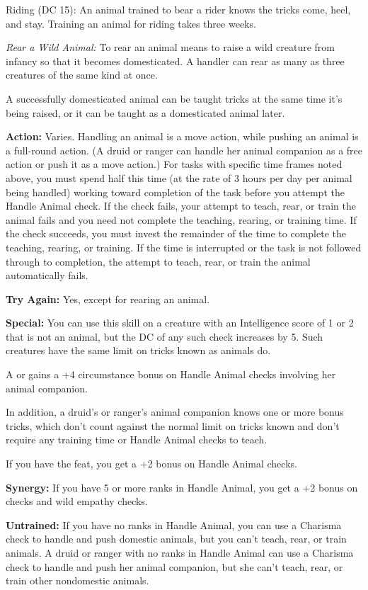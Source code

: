 Riding (DC 15): An animal trained to bear a rider knows the tricks come, heel, 
and stay. Training an animal for riding takes three weeks.

\vspace{12pt}
\textit{Rear a Wild Animal:} To rear an animal means to raise a wild creature from 
infancy so that it becomes domesticated. A handler can rear as many as three creatures 
of the same kind at once.

A successfully domesticated animal can be taught tricks at the same time it's being 
raised, or it can be taught as a domesticated animal later.

\textbf{Action:} Varies. Handling an animal is a move action, while pushing an 
animal is a full-round action. (A druid or ranger can handle her animal companion 
as a free action or push it as a move action.) For tasks with specific time frames 
noted above, you must spend half this time (at the rate of 3 hours per day per 
animal being handled) working toward completion of the task before you attempt 
the Handle Animal check. If the check fails, your attempt to teach, rear, or train 
the animal fails and you need not complete the teaching, rearing, or training time. 
If the check succeeds, you must invest the remainder of the time to complete the 
teaching, rearing, or training. If the time is interrupted or the task is not followed 
through to completion, the attempt to teach, rear, or train the animal automatically 
fails.

\textbf{Try Again:} Yes, except for rearing an animal.

\textbf{Special:} You can use this skill on a creature with an Intelligence score 
of 1 or 2 that is not an animal, but the DC of any such check increases by 5. Such 
creatures have the same limit on tricks known as animals do.

A  or  gains a +4 circumstance bonus on Handle Animal checks involving 
her animal companion.

In addition, a druid's or ranger's animal companion knows one or more bonus tricks, 
which don't count against the normal limit on tricks known and don't require any 
training time or Handle Animal checks to teach.

If you have the  feat, you get a +2 bonus on Handle Animal checks.

\textbf{Synergy:} If you have 5 or more ranks in Handle Animal, you get a +2 bonus 
on  checks and wild empathy checks.

\textbf{Untrained:} If you have no ranks in Handle Animal, you can use a Charisma 
check to handle and push domestic animals, but you can't teach, rear, or train 
animals. A druid or ranger with no ranks in Handle Animal can use a Charisma check 
to handle and push her animal companion, but she can't teach, rear, or train other 
nondomestic animals.
